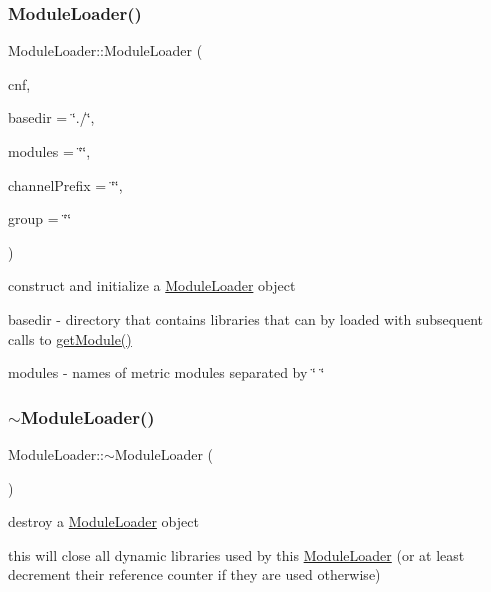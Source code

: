 \subsubsection{\texorpdfstring{Module\+Loader()}{ModuleLoader()}}
{\footnotesize\ttfamily Module\+Loader\+::\+Module\+Loader (\begin{DoxyParamCaption}\item[{\hyperlink{classConfigManager}{Config\+Manager} $\ast$}]{cnf,  }\item[{string}]{basedir = {\ttfamily \char`\"{}./\char`\"{}},  }\item[{string}]{modules = {\ttfamily \char`\"{}\char`\"{}},  }\item[{string}]{channel\+Prefix = {\ttfamily \char`\"{}\char`\"{}},  }\item[{string}]{group = {\ttfamily \char`\"{}\char`\"{}} }\end{DoxyParamCaption})}



construct and initialize a \hyperlink{classModuleLoader}{Module\+Loader} object 

\begin{DoxyItemize}
\item {\ttfamily basedir} -\/ directory that contains libraries that can by loaded with subsequent calls to \hyperlink{classModuleLoader_ac39cac913d2201252c2501664c9926f7}{get\+Module()} \item {\ttfamily modules} -\/ names of metric modules separated by \char`\"{} \char`\"{} \end{DoxyItemize}
\mbox{\label{classModuleLoader_a79d95bc9360ee001972bb1990d37b1a5}} 
\subsubsection{\texorpdfstring{$\sim$\+Module\+Loader()}{~ModuleLoader()}}
{\footnotesize\ttfamily Module\+Loader\+::$\sim$\+Module\+Loader (\begin{DoxyParamCaption}{ }\end{DoxyParamCaption})}



destroy a \hyperlink{classModuleLoader}{Module\+Loader} object 

this will close all dynamic libraries used by this \hyperlink{classModuleLoader}{Module\+Loader} (or at least decrement their reference counter if they are used otherwise) 

